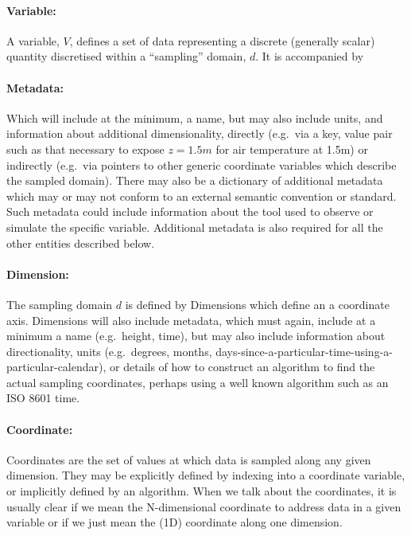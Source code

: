 \paragraph{Variable:}%
\label{variable}

A variable, \(V\), defines a set of data representing a discrete
(generally scalar) quantity discretised within a ``sampling'' domain,
\(d\). It is accompanied by

\paragraph{Metadata:}%
\label{metadata}

Which will include at the minimum, a name, but may also include units,
and information about additional dimensionality, directly (e.g.~via a
key, value pair such as that necessary to expose \(z=1.5m\) for air
temperature at 1.5m) or indirectly (e.g.~via pointers to other generic
coordinate variables which describe the sampled domain). There may also
be a dictionary of additional metadata which may or may not conform to
an external semantic convention or standard. Such metadata could include
information about the tool used to observe or simulate the specific
variable. Additional metadata is also required for all the other
entities described below.

\paragraph{Dimension:}%
\label{dimension}

The sampling domain \(d\) is defined by Dimensions which define an a
coordinate axis. Dimensions will also include metadata, which must
again, include at a minimum a name (e.g.~height, time), but may also
include information about directionality, units (e.g.~degrees, months,
days-since-a-particular-time-using-a-particular-calendar), or details of
how to construct an algorithm to find the actual sampling coordinates,
perhaps using a well known algorithm such as an ISO 8601 time.

\paragraph{Coordinate:}%
\label{coordinate}

Coordinates are the set of values at which data is sampled along any
given dimension. They may be explicitly defined by indexing into a
coordinate variable, or implicitly defined by an algorithm. When we talk
about the coordinates, it is usually clear if we mean the N-dimensional
coordinate to address data in a given variable or if we just mean the
(1D) coordinate along one dimension.

